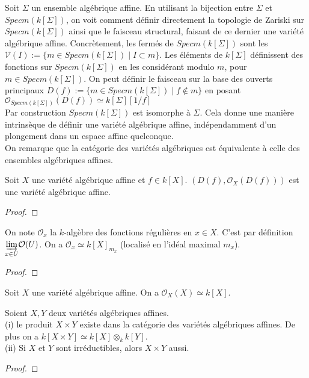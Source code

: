 Soit $\Sigma$ un ensemble algébrique affine. En utilisant la bijection entre $\Sigma$ et $Specm(k[\Sigma])$, on voit comment définir directement la topologie de Zariski sur $Specm(k[\Sigma])$ ainsi que le faisceau structural, faisant de ce dernier une variété algébrique affine. Concrètement, les fermés de $Specm(k[\Sigma])$ sont les $\mathcal{V}(I):=\lbrace m \in Specm(k[\Sigma]) \mid I\subset m \rbrace$. Les éléments de $k[\Sigma]$ définissent des fonctions sur $Specm(k[\Sigma])$ en les considérant modulo $m$, pour $m \in Specm(k[\Sigma])$. On peut définir le faisceau sur la base des ouverts principaux $D(f):=\lbrace m \in Specm(k[\Sigma]) \mid f \notin m\rbrace$ en posant $\mathcal{O}_{Specm(k[\Sigma])}(D(f))\simeq k[\Sigma][1/f]$\\
Par construction $Specm(k[\Sigma])$ est isomorphe à $\Sigma$. Cela donne une manière intrinsèque de définir une variété algébrique affine, indépendamment d'un plongement dans un espace affine quelconque.\\
On remarque que la catégorie des variétés algébriques est équivalente à celle des ensembles algébriques affines.
\begin{ex}
Soit $X$ une variété algébrique affine et $f\in k[X]$. $(D(f), \mathcal{O}_X(D(f)))$ est une variété algébrique affine.
\end{ex}
\begin{proof}

\end{proof}

\begin{prop}
On note $\mathcal{O}_x$ la $k$-algèbre des fonctions régulières en $x\in X$. C'est par définition $ \underset{x\in U}{\varinjlim} \mathcal{O}(U)$. On a $\mathcal{O}_x\simeq k[X]_{m_x}$ (localisé en l'idéal maximal $m_x$).
\end{prop}
\begin{proof}

\end{proof}

\begin{cor}
Soit $X$ une variété algébrique affine. On a $\mathcal{O}_X(X)\simeq k[X]$.
\end{cor}



\begin{prop}Soient $X,Y$ deux variétés algébriques affines.\\
(i) le produit $X\times Y$ existe dans la catégorie des variétés algébriques affines. De plus on a $k[X\times Y]\simeq k[X]\otimes _k k[Y]$.\\
(ii) Si $X$ et $Y$ sont irréductibles, alors $X\times Y$ aussi.
\end{prop}
\begin{proof}

\end{proof}
